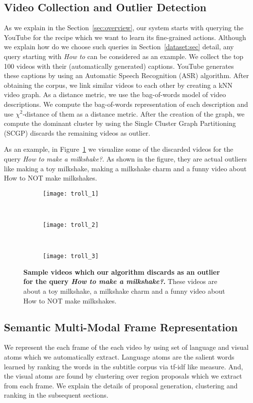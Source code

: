 \subsection{Video Collection and Outlier Detection}
\label{filter}
As we explain in the Section~\ref{sec:overview}, our system starts with querying the YouTube for the recipe which we want to learn its fine-grained actions. Although we explain how do we choose such queries in Section~\ref{dataset:sec} detail, any query starting with \emph{How to} can be considered as an example. We collect the top 100 videos with their (automatically generated) captions. YouTube generates these captions by using an Automatic Speech Recognition (ASR) algorithm. After obtaining the corpus, we link similar videos to each other by creating a kNN video graph. As a distance metric, we use the bag-of-words model of video descriptions. We compute the bag-of-words representation of each description and use $\chi^2$-distance of them as a distance metric. After the creation of the graph, we compute the dominant cluster by using the Single Cluster Graph Partitioning (SCGP)\cite{scgp} discards the remaining videos as outlier.

As an example, in Figure~\ref{outliers} we visualize some of the discarded videos for the query \emph{How to make a milkshake?}. As shown in the figure, they are actual outliers like making a toy milkshake, making a milkshake charm and a funny video about How to NOT make milkshakes.
\begin{figure}[ht]
  \begin{subfigure}[b]{0.16\textwidth}
    \texttt{[image: troll\_1]}
  \end{subfigure}~
  \begin{subfigure}[b]{0.16\textwidth}
    \texttt{[image: troll\_2]}
  \end{subfigure}~
  \begin{subfigure}[b]{0.16\textwidth}
    \texttt{[image: troll\_3]}
  \end{subfigure}
\caption{\textbf{Sample videos which our algorithm discards as an outlier for the query \emph{How to make a milkshake?}.} These videos are about a toy milkshake, a milkshake charm and a funny video about How to NOT make milkshakes.}
\label{outliers}
\end{figure}

\subsection{Semantic Multi-Modal Frame Representation}
We represent the each frame of the each video by using set of language and visual atoms which we automatically extract. Language atoms are the salient words learned by ranking the words in the subtitle corpus via tf-idf like measure. And, the visual atoms are found by clustering over region proposals which we extract from each frame. We explain the details of proposal generation, clustering and ranking in the subsequent sections.

